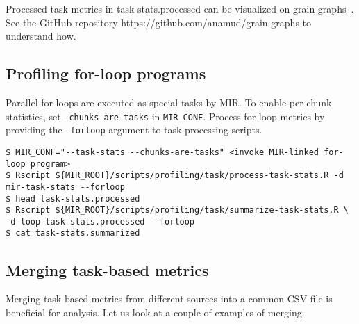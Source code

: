 \documentclass[11pt,a4paper]{article}
\begin{document}
Processed task metrics in \textsf{task-stats.processed} can be visualized on grain graphs~\cite{muddukrishna2015grain}. See the GitHub repository \textsf{https://github.com/anamud/grain-graphs} to understand how.

\subsection{Profiling for-loop programs}

Parallel for-loops are executed as special tasks by MIR. To enable per-chunk statistics, set \texttt{--chunks-are-tasks} in \texttt{MIR\_CONF}. Process for-loop metrics by providing the \texttt{--forloop} argument to task processing scripts.

\begin{lstlisting}[style=MyInputStyle]
$ MIR_CONF="--task-stats --chunks-are-tasks" <invoke MIR-linked for-loop program>
$ Rscript ${MIR_ROOT}/scripts/profiling/task/process-task-stats.R -d mir-task-stats --forloop
$ head task-stats.processed
$ Rscript ${MIR_ROOT}/scripts/profiling/task/summarize-task-stats.R \
-d loop-task-stats.processed --forloop
$ cat task-stats.summarized
\end{lstlisting}

\subsection{Merging task-based metrics}
\label{sub:merging_task_based_metrics}

Merging task-based metrics from different sources into a common CSV file is beneficial for analysis. Let us look at a couple of examples of merging.
\end{document}
